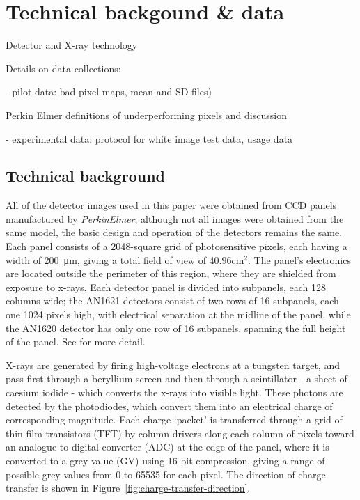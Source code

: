 \documentclass[\main/IO-Pixels.tex]{subfiles}
\begin{document}
 
 
\section{Technical backgound \& data}
\begin{outline}
Detector and X-ray technology

Details on data collections: 

- pilot data: bad pixel maps, mean and SD files)

  Perkin Elmer definitions of underperforming pixels and discussion
  
- experimental data: protocol for white image test data, usage data
\end{outline}

\subsection{Technical background}

All of the detector images used in this paper were obtained from CCD panels manufactured by \textit{PerkinElmer}; although not all images were obtained from the same model, the basic design and operation of the detectors remains the same. Each panel consists of a 2048-square grid of photosensitive pixels, each having a width of \SI{200}{\micro\meter}, giving a total field of view of 40.96cm$^2$. The panel's electronics are located outside the perimeter of this region, where they are shielded from exposure to x-rays. Each detector panel is divided into subpanels, each 128 columns wide; the AN1621 detectors consist of two rows of 16 subpanels, each one 1024 pixels high, with electrical separation at the midline of the panel, while the AN1620 detector has only one row of 16 subpanels, spanning the full height of the panel. See  \cite{PerkinElmerManual} for more detail.

X-rays are generated by firing high-voltage electrons at a tungsten target,  and pass first through a beryllium screen  and then through a scintillator - a sheet of caesium iodide - which converts the x-rays into visible light. These photons are detected by the photodiodes, which convert them into an electrical charge of corresponding magnitude. Each charge `packet' is transferred through a grid of thin-film transistors (TFT) by column drivers  along each column of pixels toward an analogue-to-digital converter (ADC) at the edge of the panel, where it is converted to a grey value (GV) using 16-bit compression, giving a range of possible grey values from 0 to 65535 for each pixel. The direction of charge transfer is shown in Figure~\ref{fig:charge-transfer-direction}.
\end{document}
